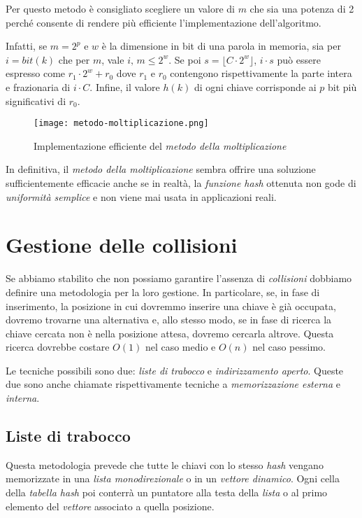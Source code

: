 \bigskip\noindent
Per questo metodo è consigliato scegliere un valore di $m$ che sia una potenza
di 2 perché consente di rendere più efficiente l'implementazione dell'algoritmo.

Infatti, se $m=2^p$ e $w$ è la dimensione in bit di una parola in memoria, sia
per $i=bit(k)$ che per $m$, vale $i,\,m\leq2^w$. Se poi $s=\lfloor C\cdot2^w\rfloor$,
$i\cdot s$ può essere espresso come $r_1\cdot2^w+r_0$ dove $r_1$ e $r_0$
contengono rispettivamente la parte intera e frazionaria di $i\cdot C$.
Infine, il valore $h(k)$ di ogni chiave corrisponde ai $p$ bit più significativi
di $r_0$.

\begin{figure}[h!]
    \centering
    \texttt{[image: metodo-moltiplicazione.png]}
    \caption{Implementazione efficiente del \emph{metodo della moltiplicazione}}
\end{figure}\noindent
In definitiva, il \emph{metodo della moltiplicazione} sembra offrire una soluzione
sufficientemente efficacie anche se in realtà, la \emph{funzione hash} ottenuta non
gode di \emph{uniformità semplice} e non viene mai usata in applicazioni reali.

\section{Gestione delle collisioni}
Se abbiamo stabilito che non possiamo garantire l'assenza di \emph{collisioni}
dobbiamo definire una metodologia per la loro gestione. In particolare, se,
in fase di inserimento, la posizione in cui dovremmo inserire una chiave è
già occupata, dovremo trovarne una alternativa e, allo stesso modo, se in fase di
ricerca la chiave cercata non è nella posizione attesa, dovremo cercarla
altrove. Questa ricerca dovrebbe costare $O(1)$ nel caso medio e $O(n)$ nel caso
pessimo.

Le tecniche possibili sono due: \emph{liste di trabocco} e \emph{indirizzamento
aperto}. Queste due sono anche chiamate rispettivamente tecniche a
\emph{memorizzazione esterna} e \emph{interna}.

\subsection{Liste di trabocco}
Questa metodologia prevede che tutte le chiavi con lo stesso \emph{hash}
vengano memorizzate in una \emph{lista monodirezionale} o in un \emph{vettore
dinamico}. Ogni cella della \emph{tabella hash} poi conterrà un puntatore alla
testa della \emph{lista} o al primo elemento del \emph{vettore} associato a quella
posizione.

